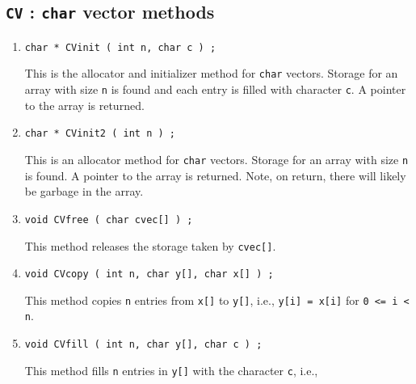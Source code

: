 \par
\subsection{{\tt CV} : {\tt char} vector methods}
\label{subsection:Utilities:proto:CV}
\par
\begin{enumerate}
\item
\begin{verbatim}
char * CVinit ( int n, char c ) ;
\end{verbatim}
This is the allocator and initializer method for {\tt char} vectors.
Storage for an array with size {\tt n} is found and each
entry is filled with character {\tt c}.
A pointer to the array is returned.
\item
\begin{verbatim}
char * CVinit2 ( int n ) ;
\end{verbatim}
This is an allocator method for {\tt char} vectors.
Storage for an array with size {\tt n} is found.
A pointer to the array is returned.
Note, on return, there will likely be garbage in the array.
\item
\begin{verbatim}
void CVfree ( char cvec[] ) ;
\end{verbatim}
This method releases the storage taken by {\tt cvec[]}.
\item
\begin{verbatim}
void CVcopy ( int n, char y[], char x[] ) ;
\end{verbatim}
This method copies {\tt n} entries from {\tt x[]} to {\tt y[]},
i.e.,
{\tt y[i] = x[i]} for {\tt 0 <= i < n}.
\item
\begin{verbatim}
void CVfill ( int n, char y[], char c ) ;
\end{verbatim}
This method fills {\tt n} entries in {\tt y[]} with the
character {\tt c}, 
i.e.,

\end{enumerate}
